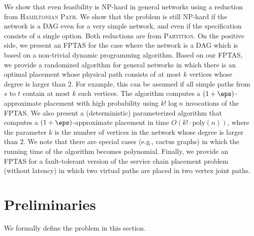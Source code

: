 We show that even feasibility is NP-hard in general networks using a
reduction from \textsc{Hamiltonian Path}.
We show that the problem is still NP-hard if the network is a DAG even
for a very simple network, and even if the specification consists of a
single option.  Both reductions are from \textsc{Partition}.
%
On the positive side, we present an FPTAS for the case where the
network is a DAG which is based on a non-trivial dynamic programming
algorithm.
%
Based on our FPTAS, we provide a randomized algorithm for general
networks in which there is an optimal placement whose physical path
consists of at most $k$ vertices whose degree is larger than $2$.  For
example, this can be assumed if all simple paths from $s$ to $t$
contain at most $k$ such vertices.  The algorithm computes a
$(1+\eps)$-approximate placement with high probability using $k! \log
n$ invocations of the FPTAS.
%
We also present a (deterministic) parameterized algorithm that
computes a $(1+\eps)$-approximate placement in time $O(k! \cdot
\text{poly}(n))$, where the parameter $k$ is the number of vertices in
the network whose degree is larger than $2$.
%
We note that there are special cases (e.g., cactus graphs) in which
the running time of the algorithm becomes polynomial.
%
Finally, we provide an FPTAS for a fault-tolerant version of the
service chain placement problem (without latency) in which two
virtual paths are placed in two vertex joint paths.


\section{Preliminaries}

We formally define the problem in this section.


